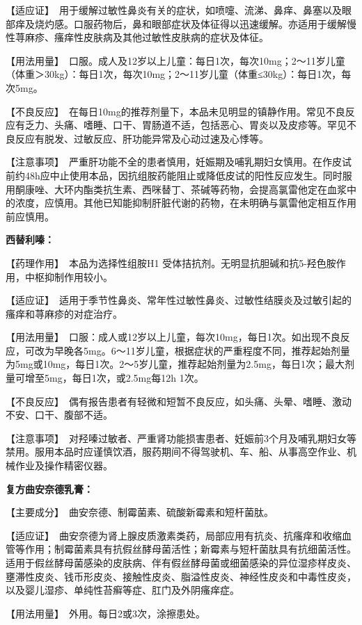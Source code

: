 【适应证】　用于缓解过敏性鼻炎有关的症状，如喷嚏、流涕、鼻痒、鼻塞以及眼部痒及烧灼感。口服药物后，鼻和眼部症状及体征得以迅速缓解。亦适用于缓解慢性荨麻疹、瘙痒性皮肤病及其他过敏性皮肤病的症状及体征。

【用法用量】　口服。成人及12岁以上儿童：每日1次，每次10mg；2～11岁儿童（体重＞30kg）：每日1次，每次10mg；2～11岁儿童（体重≤30kg）：每日1次，每次5mg。

【不良反应】　在每日10mg的推荐剂量下，本品未见明显的镇静作用。常见不良反应有乏力、头痛、嗜睡、口干、胃肠道不适，包括恶心、胃炎以及皮疹等。罕见不良反应有脱发、过敏反应、肝功能异常及心动过速及心悸等。

【注意事项】　严重肝功能不全的患者慎用，妊娠期及哺乳期妇女慎用。在作皮试前约48h应中止使用本品，因抗组胺药能阻止或降低皮试的阳性反应发生。同时服用酮康唑、大环内酯类抗生素、西咪替丁、茶碱等药物，会提高氯雷他定在血浆中的浓度，应慎用。其他已知能抑制肝脏代谢的药物，在未明确与氯雷他定相互作用前应慎用。

\textbf{西替利嗪：}

【药理作用】　本品为选择性组胺H{1}
受体拮抗剂。无明显抗胆碱和抗5-羟色胺作用，中枢抑制作用较小。

【适应证】　适用于季节性鼻炎、常年性过敏性鼻炎、过敏性结膜炎及过敏引起的瘙痒和荨麻疹的对症治疗。

【用法用量】　口服：成人或12岁以上儿童，每次10mg，每日1次。如出现不良反应，可改为早晚各5mg。6～11岁儿童，根据症状的严重程度不同，推荐起始剂量为5mg或10mg，每日1次。2～5岁儿童，推荐起始剂量为2.5mg，每日1次；最大剂量可增至5mg，每日1次，或2.5mg每12h
1次。

【不良反应】　偶有报告患者有轻微和短暂不良反应，如头痛、头晕、嗜睡、激动不安、口干、腹部不适。

【注意事项】　对羟嗪过敏者、严重肾功能损害患者、妊娠前3个月及哺乳期妇女等禁用。服用本品时应谨慎饮酒，服药期间不得驾驶机、车、船、从事高空作业、机械作业及操作精密仪器。

\textbf{复方曲安奈德乳膏：}

【主要成分】　曲安奈德、制霉菌素、硫酸新霉素和短杆菌肽。

【适应证】　曲安奈德为肾上腺皮质激素类药，局部应用有抗炎、抗瘙痒和收缩血管等作用；制霉菌素具有抗假丝酵母菌活性；新霉素与短杆菌肽具有抗细菌活性。适用于假丝酵母菌感染的皮肤病、伴有假丝酵母菌或细菌感染的异位湿疹样皮炎、壅滞性皮炎、钱币形皮炎、接触性皮炎、脂溢性皮炎、神经性皮炎和中毒性皮炎，以及婴儿湿疹、单纯性苔癣等症、肛门及外阴瘙痒症。

【用法用量】　外用。每日2或3次，涂擦患处。


